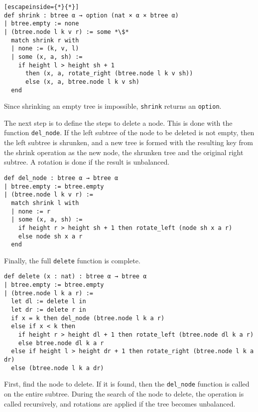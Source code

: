 \begin{lstlisting}[escapeinside={*}{*}]
def shrink : btree α → option (nat × α × btree α)
| btree.empty := none
| (btree.node l k v r) := some *\$*
  match shrink r with
  | none := (k, v, l)
  | some (x, a, sh) :=
    if height l > height sh + 1
      then (x, a, rotate_right (btree.node l k v sh))
      else (x, a, btree.node l k v sh)
  end
\end{lstlisting}

Since shrinking an empty tree is impossible, \lstinline{shrink} returns an \lstinline{option}.

The next step is to define the steps to delete a node. This is done with the function \lstinline{del_node}. If the left subtree of the node to be deleted is not empty, then the left subtree is shrunken, and a new tree is formed with the resulting key from the shrink operation as the new node, the shrunken tree and the original right subtree. A rotation is done if the result is unbalanced. 

\begin{lstlisting}
def del_node : btree α → btree α
| btree.empty := btree.empty
| (btree.node l k v r) :=
  match shrink l with 
  | none := r
  | some (x, a, sh) :=
    if height r > height sh + 1 then rotate_left (node sh x a r)
    else node sh x a r
  end
\end{lstlisting}

Finally, the full \lstinline{delete} function is complete. 

\begin{lstlisting}
def delete (x : nat) : btree α → btree α
| btree.empty := btree.empty
| (btree.node l k a r) :=
  let dl := delete l in
  let dr := delete r in
  if x = k then del_node (btree.node l k a r)
  else if x < k then
    if height r > height dl + 1 then rotate_left (btree.node dl k a r)
    else btree.node dl k a r
  else if height l > height dr + 1 then rotate_right (btree.node l k a dr)
  else (btree.node l k a dr)
\end{lstlisting}

First, find the node to delete. If it is found, then the \lstinline{del_node} function is called on the entire subtree. During the search of the node to delete, the operation is called recursively, and rotations are applied if the tree becomes unbalanced. 